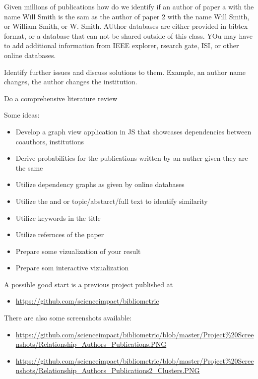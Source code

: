 Given millions of publications how do we identify if an author of paper
a with the name Will Smith is the sam as the author of paper 2 with the
name Will Smith, or William Smith, or W. Smith. AUthor databases are
either provided in bibtex format, or a database that can not be shared
outside of this class. YOu may have to add additional information from
IEEE explorer, rsearch gate, ISI, or other online databases.

Identify further issues and discuss solutions to them. Example, an
author name changes, the author changes the institution.

Do a comprehensive literature review

Some ideas:

\begin{itemize}

\item
  Develop a graph view application in JS that showcases dependencies
  between coauthors, institutions
\item
  Derive probabilities for the publications written by an auther given
  they are the same
\item
  Utilize dependency graphs as given by online databases
\item
  Utilize the and or topic/abstarct/full text to identify similarity
\item
  Utilize keywords in the title
\item
  Utilize refernces of the paper
\item
  Prepare some vizualization of your result
\item
  Prepare som interactive vizualization
\end{itemize}

A possible good start is a previous project published at

\begin{itemize}

\item
  \url{https://github.com/scienceimpact/bibliometric}
\end{itemize}

There are also some screenshots available:

\begin{itemize}

\item
  \url{https://github.com/scienceimpact/bibliometric/blob/master/Project\%20Screenshots/Relationship_Authors_Publications.PNG}
\item
  \url{https://github.com/scienceimpact/bibliometric/blob/master/Project\%20Screenshots/Relationship_Authors_Publications2_Clusters.PNG}
\end{itemize}
